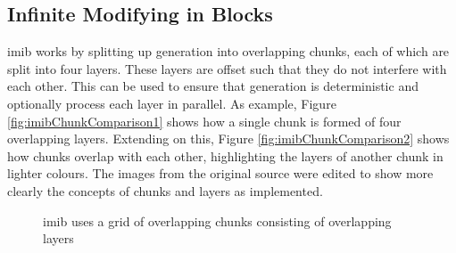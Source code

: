 \subsection{Infinite Modifying in Blocks}
\label{sec:IMIB}
\acrlong{imib} works by splitting up generation into overlapping chunks, each of which are split into four layers. These layers are offset such that they do not interfere with each other. This can be used to ensure that generation is deterministic and optionally process each layer in parallel. As example, Figure \ref{fig:imibChunkComparison1} shows how a single chunk is formed of four overlapping layers. Extending on this, Figure \ref{fig:imibChunkComparison2} shows how chunks overlap with each other, highlighting the layers of another chunk in lighter colours. The images from the original source were edited to show more clearly the concepts of chunks and layers as implemented.

\begin{figure}[H]
    \centering
    \hfill
    \caption{\acrshort{imib} uses a grid of overlapping chunks consisting of overlapping layers}
    \label{fig:imibChunkComparison}
\end{figure}

